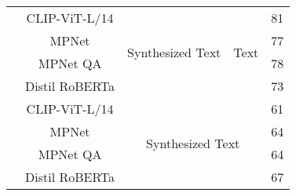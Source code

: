 \documentclass{article}
\begin{document}
\begin{table}[!htb]
\begin{tabular}{@{}ccccc@{}}
  & CLIP-ViT-L/14                   & \multirow{4}{*}{Synthesized Text} & \multirow{4}{*}{Text}             & 81                             \\
  & MPNet                  &                                   &                                   & 77                             \\
  & MPNet QA               &                                   &                                   & 78                             \\
  & Distil RoBERTa         &                                   &                                   & 73                             \\ \cmidrule(l){2-5}
  & CLIP-ViT-L/14                   & \multicolumn{2}{c}{\multirow{4}{*}{Synthesized Text}}                 & 61                             \\
  & MPNet                  & \multicolumn{2}{c}{}                                                  & 64                             \\
  & MPNet QA               & \multicolumn{2}{c}{}                                                  & 64                             \\
  & Distil RoBERTa         & \multicolumn{2}{c}{}                                                  & 67                            \\ \bottomrule
\end{tabular}\end{table}   
\end{document}
